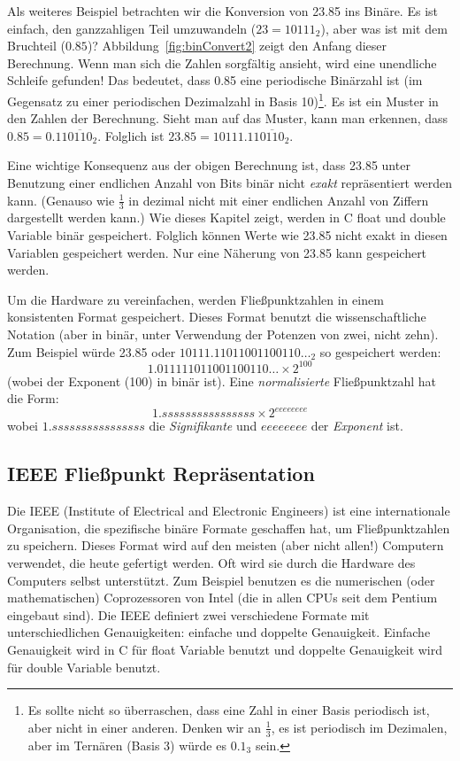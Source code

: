 Als weiteres Beispiel betrachten wir die Konversion von 23.85 ins
Bin\"{a}re. Es ist einfach, den ganzzahligen Teil umzuwandeln ($23 =
10111_2$), aber was ist mit dem Bruchteil ($0.85$)?
Abbildung~\ref{fig:binConvert2} zeigt den Anfang dieser Berechnung.
Wenn man sich die Zahlen sorgf\"{a}ltig ansieht, wird eine unendliche
Schleife gefunden! Das bedeutet, dass 0.85 eine periodische
Bin\"{a}rzahl ist (im Gegensatz zu einer periodischen Dezimalzahl in
Basis 10)\footnote{Es sollte nicht so \"{u}berraschen, dass eine Zahl in
einer Basis periodisch ist, aber nicht in einer anderen. Denken wir
an $\frac{1}{3}$, es ist periodisch im Dezimalen, aber im Tern\"{a}ren
(Basis 3) w\"{u}rde es $0.1_3$ sein.}. Es ist ein Muster in den Zahlen
der Berechnung. Sieht man auf das Muster, kann man erkennen, dass
$0.85 = 0.11\overline{0110}_2$. Folglich ist $23.85 =
10111.11\overline{0110}_2$.

Eine wichtige Konsequenz aus der obigen Berechnung ist, dass 23.85
unter Benutzung einer endlichen Anzahl von Bits bin\"{a}r nicht
\emph{exakt} repr\"{a}sentiert werden kann. (Genauso wie $\frac{1}{3}$
in dezimal nicht mit einer endlichen Anzahl von Ziffern dargestellt
werden kann.) Wie dieses Kapitel zeigt, werden in C {\code float}
und {\code double} Variable bin\"{a}r gespeichert. Folglich k\"{o}nnen Werte
wie 23.85 nicht exakt in diesen Variablen gespeichert werden. Nur
eine N\"{a}herung von 23.85 kann gespeichert werden.

Um die Hardware zu vereinfachen, werden Flie{\ss}punktzahlen in einem
konsistenten Format gespeichert. Dieses Format benutzt die
wissenschaftliche Notation (aber in bin\"{a}r, unter Verwendung der
Potenzen von zwei, nicht zehn). Zum Beispiel w\"{u}rde 23.85 oder
$10111.11011001100110\ldots_2$ so gespeichert werden:
\[ 1.011111011001100110\ldots \times 2^{100} \]
(wobei der Exponent (100) in bin\"{a}r ist). Eine \emph{normalisierte}
Flie{\ss}punktzahl hat die Form:
\[ 1.ssssssssssssssss \times 2^{eeeeeeee} \]
wobei $1.ssssssssssssssss$ die \emph{Signifikante} und $eeeeeeee$
der \emph{Exponent} ist.

\subsection{IEEE Flie{\ss}punkt Repr\"{a}sentation} 

Die IEEE (Institute of Electrical and Electronic Engineers) ist eine
internationale Organisation, die spezifische bin\"{a}re Formate
geschaffen hat, um Flie{\ss}punktzahlen zu speichern. Dieses Format wird
auf den meisten (aber nicht allen!) Computern verwendet, die heute
gefertigt werden. Oft wird sie durch die Hardware des Computers
selbst unterst\"{u}tzt. Zum Beispiel benutzen es die numerischen (oder
mathematischen) Coprozessoren von Intel (die in allen CPUs seit dem
Pentium eingebaut sind). Die IEEE definiert zwei verschiedene
Formate mit unterschiedlichen Genauigkeiten: einfache und doppelte
Genauigkeit. Einfache Genauigkeit wird in C f\"{u}r {\code float}
Variable benutzt und doppelte Genauigkeit wird f\"{u}r {\code double}
Variable benutzt.

